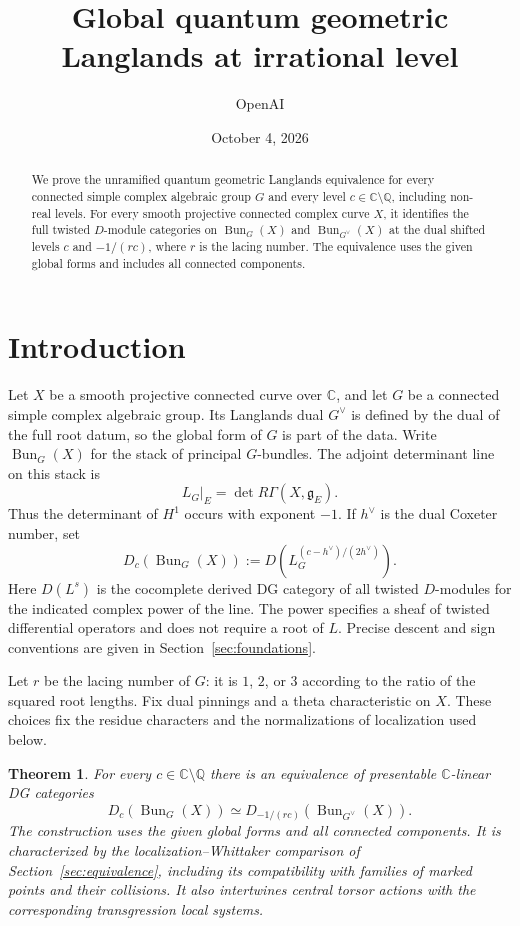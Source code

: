 \documentclass[11pt]{article}
\title{Global quantum geometric Langlands at irrational level}
\author{OpenAI}
\date{October 4, 2026}
\numberwithin{equation}{section}
\newtheorem{theorem}{Theorem}[section]
\theoremstyle{definition}
\theoremstyle{remark}
\begin{document}
\maketitle
\begin{abstract}
We prove the unramified quantum geometric Langlands equivalence for every
connected simple complex algebraic group $G$ and every level
$c\in\mathbb C\setminus\mathbb Q$, including non-real levels. For every smooth
projective connected complex curve $X$, it identifies the full twisted
$D$-module categories on $\operatorname{Bun}_G(X)$ and
$\operatorname{Bun}_{G^\vee}(X)$ at the dual shifted levels $c$ and
$-1/(rc)$, where $r$ is the lacing number. The equivalence uses the given
global forms and includes all connected components.
\end{abstract}
\tableofcontents
\section{Introduction}\label{sec:introduction}

Let $X$ be a smooth projective connected curve over $\mathbb C$, and let $G$
be a connected simple complex algebraic group. Its Langlands dual
$G^\vee$ is defined by the dual of the full root datum, so the global form
of $G$ is part of the data. Write $\operatorname{Bun}_G(X)$ for the stack
of principal $G$-bundles. The adjoint determinant line on this stack is
\[
  L_G|_E=\det R\Gamma(X,\mathfrak g_E).
\]
Thus the determinant of $H^1$ occurs with exponent $-1$. If $h^\vee$ is
the dual Coxeter number, set
\begin{equation}\label{intro:level}
  D_c(\operatorname{Bun}_G(X))
  :=D\!\left(L_G^{(c-h^\vee)/(2h^\vee)}\right).
\end{equation}
Here $D(L^s)$ is the cocomplete derived DG category of all twisted
$D$-modules for the indicated complex power of the line. The power specifies
a sheaf of twisted differential operators and does not require a root of
$L$. Precise descent and sign conventions are given in
Section~\ref{sec:foundations}.

Let $r$ be the lacing number of $G$: it is $1$, $2$, or $3$ according to
the ratio of the squared root lengths. Fix dual pinnings and a theta
characteristic on $X$. These choices fix the residue characters and the
normalizations of localization used below.

\begin{theorem}\label{thm:main}
For every $c\in\mathbb C\setminus\mathbb Q$ there is an equivalence of
presentable $\mathbb C$-linear DG categories
\begin{equation}\label{intro:equivalence}
  D_c(\operatorname{Bun}_G(X))
    \simeq
  D_{-1/(rc)}(\operatorname{Bun}_{G^\vee}(X)).
\end{equation}
The construction uses the given global forms and all connected components.
It is characterized by the localization--Whittaker comparison of
Section~\ref{sec:equivalence}, including its compatibility with families of
marked points and their collisions. It also intertwines central torsor actions
with the corresponding transgression local systems.
\end{theorem}
\end{document}
